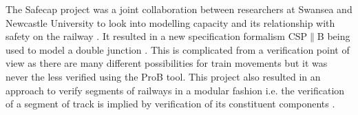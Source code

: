 The Safecap project was a joint collaboration between researchers at Swansea and Newcastle University to look into modelling capacity and its relationship with safety on the railway \cite{YI12}. It resulted in a new specification formalism CSP$\parallel$B being used to model a double junction \cite{FM12}. This is complicated from a verification point of view as there are many different possibilities for train movements but it was never the less verified using the ProB tool. This project also resulted in an approach to verify segments of railways in a modular fashion i.e. the verification of a segment of track is implied by verification of its constituent components \cite{FM12b}.



\begin{comment}

Previously James carried out work for Invensys, applying various SAT and model
checking techniques to verify the correctness of a simple pelican crossing and
two existing railway interlockings consisting of approximately 500 rungs (see
James \cite{PJames}).

James used  Kanso's work (See \cite{KKanso}), in particular his 
translation from ladder logic into propositional logic,
and applied several model checking techniques in order to try and
reduce the complexity of the problems. Both the work by Kanso and James was based on an early feasibility study by
Fokkink and Hollingshead \cite{WF98}. The relationship between a ladder logic program and
propositional logic was discussed in great detail. A method for formulating
such a ladder logic program as a formula in propositional logic was
presented. This laid the ground work for all successive projects involving
ladder logic. The possible application of program slicing was discussed and
this was later applied in the work by James \cite{PJames}.

Some of the techniques applied by James to the verification of ladder logic
are discussed below.

\begin{description}


\item[Bounded model checking:] This was the  main topic of the work of Phil James. It had the advantage that it produced counter
  example traces which are highly valuable to the engineers at Invensys. It allowed for the
  verification of 2000 iterations of the ladder logic programs provided
  without programming slicing and up to 20000 iterations of ladder logic
  programs with program slicing.


\end{comment}
